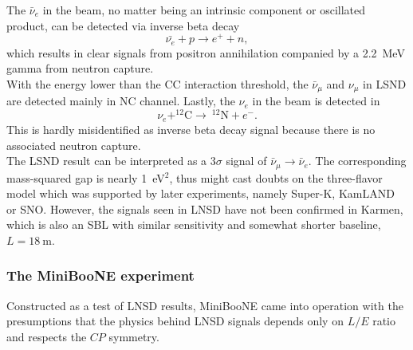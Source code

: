 The $ \bar{\nu}_e $ in the beam, no matter being an intrinsic component or oscillated product, can be detected via inverse beta decay
\begin{equation}
	\bar{\nu_e} + p \rightarrow e^+ + n,
\end{equation}
which results in clear signals from positron annihilation companied by a 2.2~MeV gamma from neutron capture. \\

With the energy lower than the CC interaction threshold, the $ \bar{\nu}_\mu $ and $ \nu_\mu $ in LSND are detected mainly in NC channel. Lastly, the $ \nu_e $ in the beam is detected in
\begin{equation}
	\nu_e + ^{12}\text{C} \rightarrow~ ^{12}\text{N} + e^-.
\end{equation}
This is hardly misidentified as inverse beta decay signal because there is no associated neutron capture.\\

The LSND result can be interpreted as a 3$ \sigma $ signal of $ \bar{\nu}_\mu \rightarrow \bar{\nu}_e $. The corresponding mass-squared gap is nearly 1~eV$^2$, thus might cast doubts on the three-flavor model which was supported by later experiments, namely Super-K, KamLAND or SNO. However, the signals seen in LNSD have not been confirmed in Karmen, which is also an SBL with similar sensitivity and somewhat shorter baseline, $ L=18~$m. 

\subsubsection{The MiniBooNE experiment}
Constructed as a test of LNSD results, MiniBooNE came into operation with the presumptions that the physics behind LNSD signals depends only on $ L/E $ ratio and respects the $ CP $ symmetry.\\

